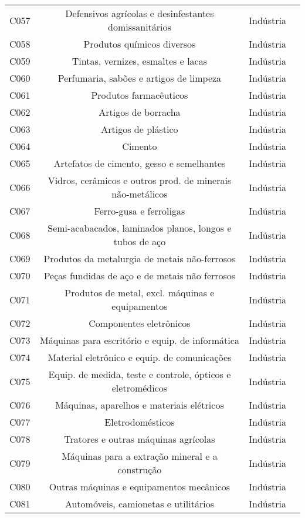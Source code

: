 \begin{apendicesenv}
\begin{small}
\begin{center}
\begin{longtable}{lccc}
				C057 & Defensivos agrícolas e desinfestantes domissanitários & Indústria \\
				C058 & Produtos químicos diversos & Indústria \\
				C059 & Tintas, vernizes, esmaltes e lacas & Indústria \\
				C060 & Perfumaria, sabões e artigos de limpeza & Indústria \\
				C061 & Produtos farmacêuticos & Indústria \\
				C062 & Artigos de borracha & Indústria \\
				C063 & Artigos de plástico & Indústria \\
				C064 & Cimento & Indústria \\
				C065 & Artefatos de cimento, gesso e semelhantes & Indústria \\
				C066 & Vidros, cerâmicos e outros prod. de minerais não-metálicos & Indústria \\
				C067 & Ferro-gusa e ferroligas & Indústria \\
				C068 & Semi-acabacados, laminados planos, longos e tubos de aço & Indústria \\
				C069 & Produtos da metalurgia de metais não-ferrosos & Indústria \\
				C070 & Peças fundidas de aço e de metais não ferrosos & Indústria \\
				C071 & Produtos de metal, excl. máquinas e equipamentos & Indústria \\
				C072 & Componentes eletrônicos & Indústria \\
				C073 & Máquinas para escritório e equip. de informática & Indústria \\
				C074 & Material eletrônico e equip. de comunicações & Indústria \\
				C075 & Equip. de medida, teste e controle, ópticos e eletromédicos & Indústria \\
				C076 & Máquinas, aparelhos e materiais elétricos & Indústria \\
				C077 & Eletrodomésticos & Indústria \\
				C078 & Tratores e outras máquinas agrícolas & Indústria \\
				C079 & Máquinas para a extração mineral e a construção & Indústria \\
				C080 & Outras máquinas e equipamentos mecânicos & Indústria \\
				C081 & Automóveis, camionetas e utilitários & Indústria \\

\end{longtable}
\end{center}
\end{small}
\end{apendicesenv}
